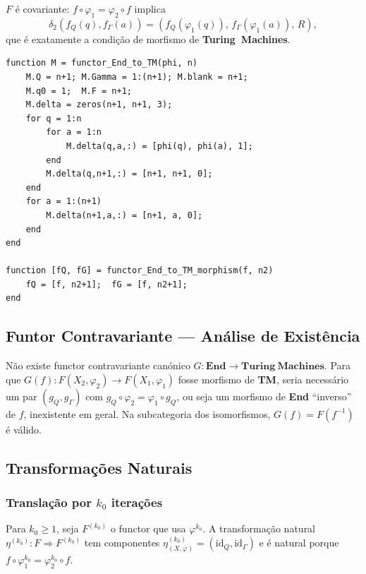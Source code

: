 \begin{proposition}
$F$ é covariante: $f \circ \varphi_1 = \varphi_2 \circ f$ implica
\[
    \delta_2(f_Q(q), f_\Gamma(a)) = (f_Q(\varphi_1(q)),\, f_\Gamma(\varphi_1(a)),\, R),
\]
que é exatamente a condição de morfismo de \textbf{Turing\ Machines}.
\end{proposition}

\begin{lstlisting}[style=matlab, caption={Funtor covariante $F: \mathbf{End} \to \mathbf{Turing\ Machines}$}]
function M = functor_End_to_TM(phi, n)
    M.Q = n+1; M.Gamma = 1:(n+1); M.blank = n+1;
    M.q0 = 1;  M.F = n+1;
    M.delta = zeros(n+1, n+1, 3);
    for q = 1:n
        for a = 1:n
            M.delta(q,a,:) = [phi(q), phi(a), 1];
        end
        M.delta(q,n+1,:) = [n+1, n+1, 0];
    end
    for a = 1:(n+1)
        M.delta(n+1,a,:) = [n+1, a, 0];
    end
end

function [fQ, fG] = functor_End_to_TM_morphism(f, n2)
    fQ = [f, n2+1];  fG = [f, n2+1];
end
\end{lstlisting}

\subsection{Funtor Contravariante --- Análise de Existência}

\begin{proposition}
Não existe functor contravariante canónico $G: \mathbf{End} \to \mathbf{Turing\ Machines}$. Para que $G(f): F(X_2, \varphi_2) \to F(X_1, \varphi_1)$ fosse morfismo de \textbf{TM}, seria necessário um par $(g_Q, g_\Gamma)$ com $g_Q \circ \varphi_2 = \varphi_1 \circ g_Q$, ou seja um morfismo de \textbf{End} ``inverso'' de $f$, inexistente em geral. Na subcategoria dos isomorfismos, $G(f) = F(f^{-1})$ é válido.
\end{proposition}

\subsection{Transformações Naturais}

\subsubsection{Translação por $k_0$ iterações}

Para $k_0 \geq 1$, seja $F^{(k_0)}$ o functor que usa $\varphi^{k_0}$. A transformação natural $\eta^{(k_0)}: F \Rightarrow F^{(k_0)}$ tem componentes $\eta^{(k_0)}_{(X,\varphi)} = (\mathrm{id}_Q, \mathrm{id}_\Gamma)$ e é natural porque $f \circ \varphi_1^{k_0} = \varphi_2^{k_0} \circ f$.

